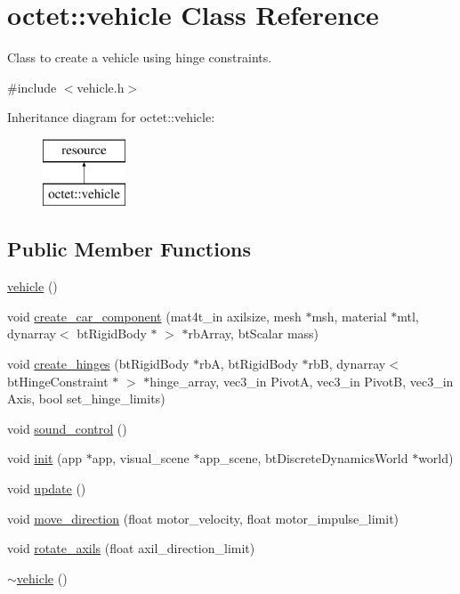 \hypertarget{classoctet_1_1vehicle}{\section{octet\+:\+:vehicle Class Reference}
\label{classoctet_1_1vehicle}
}


Class to create a vehicle using hinge constraints.  




{\ttfamily \#include $<$vehicle.\+h$>$}

Inheritance diagram for octet\+:\+:vehicle\+:\begin{figure}[H]
\begin{center}
\leavevmode
\includegraphics[height=2.000000cm]{classoctet_1_1vehicle}
\end{center}
\end{figure}
\subsection*{Public Member Functions}
\begin{DoxyCompactItemize}
\item 
\hyperlink{classoctet_1_1vehicle_a22017fec042aa7732f1699b535390787}{vehicle} ()
\item 
void \hyperlink{classoctet_1_1vehicle_aa0d5baefeba0587e62f9c62dc87506fb}{create\+\_\+car\+\_\+component} (mat4t\+\_\+in axilsize, mesh $\ast$msh, material $\ast$mtl, dynarray$<$ bt\+Rigid\+Body $\ast$ $>$ $\ast$rb\+Array, bt\+Scalar mass)
\item 
void \hyperlink{classoctet_1_1vehicle_a36bcb4433889025632bfec79f681a877}{create\+\_\+hinges} (bt\+Rigid\+Body $\ast$rb\+A, bt\+Rigid\+Body $\ast$rb\+B, dynarray$<$ bt\+Hinge\+Constraint $\ast$ $>$ $\ast$hinge\+\_\+array, vec3\+\_\+in Pivot\+A, vec3\+\_\+in Pivot\+B, vec3\+\_\+in Axis, bool set\+\_\+hinge\+\_\+limits)
\item 
void \hyperlink{classoctet_1_1vehicle_a45b69ee9ab03cf7b1c05dfdb88eb783c}{sound\+\_\+control} ()
\item 
void \hyperlink{classoctet_1_1vehicle_af1ecc8cb043d912123287e085dd3417d}{init} (app $\ast$app, visual\+\_\+scene $\ast$app\+\_\+scene, bt\+Discrete\+Dynamics\+World $\ast$world)
\item 
void \hyperlink{classoctet_1_1vehicle_a8c833c3ae603e9ae1355a60fb10a43de}{update} ()
\item 
void \hyperlink{classoctet_1_1vehicle_a21db8dc5ab149c9bd9b4243a8c7db083}{move\+\_\+direction} (float motor\+\_\+velocity, float motor\+\_\+impulse\+\_\+limit)
\item 
void \hyperlink{classoctet_1_1vehicle_a65369849e223781de684f4466074b739}{rotate\+\_\+axils} (float axil\+\_\+direction\+\_\+limit)
\item 
\hyperlink{classoctet_1_1vehicle_a8722711090082884b7f4acc4b3c2d6fe}{$\sim$vehicle} ()
\end{DoxyCompactItemize}
